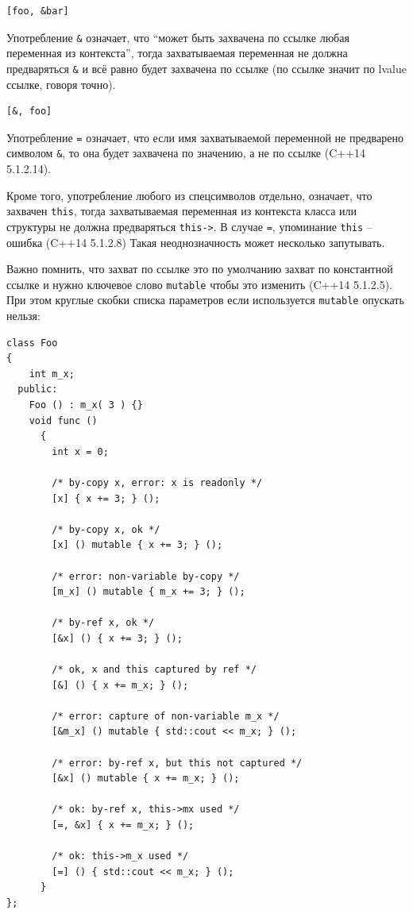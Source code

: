 \documentclass[a4paper,12pt,oneside]{article}
\begin{document}
\begin{lstlisting}
[foo, &bar]
\end{lstlisting}

Употребление \lstinline!&! означает, что ``может быть захвачена по ссылке любая переменная из контекста'', тогда захватываемая переменная не должна предваряться \lstinline!&! и всё равно будет захвачена по ссылке (по ссылке значит по lvalue ссылке, говоря точно).

\begin{lstlisting}
[&, foo]
\end{lstlisting}

Употребление \lstinline!=! означает, что если имя захватываемой переменной не предварено символом \lstinline!&!, то она будет захвачена по значению, а не по ссылке (C++14 5.1.2.14). 

Кроме того, употребление любого из спецсимволов отдельно, означает, что захвачен \lstinline!this!, тогда захватываемая переменная из контекста класса или структуры не должна предваряться \lstinline!this->!. В случае \lstinline!=!, упоминание \lstinline!this! -- ошибка (C++14 5.1.2.8)  Такая неоднозначность может несколько запутывать.

Важно помнить, что захват по ссылке это по умолчанию захват по константной ссылке и нужно ключевое слово \lstinline!mutable! чтобы это изменить (C++14 5.1.2.5). При этом круглые скобки списка параметров если используется \lstinline!mutable! опускать нельзя:

\begin{lstlisting}
class Foo
{
    int m_x;
  public:
    Foo () : m_x( 3 ) {}
    void func ()
      {
        int x = 0;

        /* by-copy x, error: x is readonly */
        [x] { x += 3; } ();
        
        /* by-copy x, ok */
        [x] () mutable { x += 3; } ();

        /* error: non-variable by-copy */
        [m_x] () mutable { m_x += 3; } (); 

        /* by-ref x, ok */
        [&x] () { x += 3; } ();

        /* ok, x and this captured by ref */
        [&] () { x += m_x; } ();

        /* error: capture of non-variable m_x */
        [&m_x] () mutable { std::cout << m_x; } (); 

        /* error: by-ref x, but this not captured */
        [&x] () mutable { x += m_x; } (); 

        /* ok: by-ref x, this->mx used */
        [=, &x] { x += m_x; } ();

        /* ok: this->m_x used */
        [=] () { std::cout << m_x; } ();
      }
};
\end{lstlisting}
\end{document}
